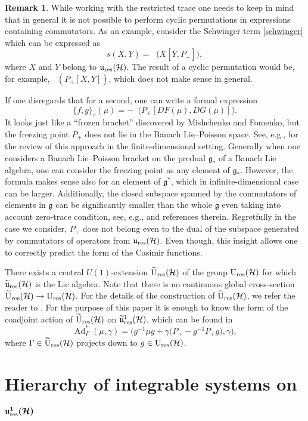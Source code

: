 \documentclass[10pt,a4paper]{amsart}
\theoremstyle{definition}
\newtheorem{rem}[thm]{Remark}
\numberwithin{equation}{section}
\renewcommand{\H}{\mathcal{H}}
\newcommand{\g}{\mathfrak{g}}
\newcommand{\Ur}{\mathrm{U}_{\textnormal{res}}(\H)}
\newcommand{\Urt}{\widetilde{\mathrm{U}}_{\textnormal{res}}(\H)}
\newcommand{\ur}{\mathfrak u_{\textnormal{res}}(\H)}
\newcommand{\urp}{\mathfrak u_{\textnormal{res}}^1(\H)}
\newcommand{\urt}{\widetilde{\mathfrak u}_{\textnormal{res}}(\H)}
\newcommand{\urtp}{\widetilde{\mathfrak u}_{\textnormal{res}}^1(\H)}
\DeclareMathOperator{\Trr}{Tr_{res}}
\DeclareMathOperator{\Ad}{Ad}
\renewcommand{\to}{\rightarrow}
\newcommand{\be}{\begin{equation}}
\newcommand{\ee}{\end{equation}}
\begin{document}
\begin{rem}\label{frozen}
While working with the restricted trace one needs to keep in mind that in general it is not possible to perform cyclic permutations in expressions containing commutators. As an example, consider the Schwinger term \eqref{schwinger} which can be expressed as
\begin{equation}\label{schwinger_expression}
s(X, Y) = \Trr\bigl(X[Y,P_+]\bigr),
\end{equation}
where $X$ and $Y$ belong to $\ur$. The result of a cyclic permutation would be, for example, $\Trr(P_+[X, Y])$, which does not make sense in general.

If one disregards that for a second, one can write a formal expression
\[ \{f,g\}_s(\mu)=-\Trr\bigl( P_+ [DF(\mu),DG(\mu)]\bigr). \]
It looks just like a ``frozen bracket'' discovered by Mishchenko and Fomenko, but the freezing point $P_+$ does not lie in the Banach Lie--Poisson space. See, e.g., \cite{bols-bor,fomenko-trofimov} for the review of this approach in the finite-dimensional setting. Generally when one considers a Banach Lie--Poisson bracket on the predual $\g_*$ of a Banach Lie algebra, one can consider the freezing point as any element of $\g_*$. However, the formula makes sense also for an element of $\g^*$, which in infinite-dimensional case can be larger. Additionally, the closed subspace spanned by the commutators of elements in $\g$ can be significantly smaller than the whole $\g$ even taking into account zero-trace condition, see, e.g., \cite{kalton89} and references therein. Regretfully in the case we consider, $P_+$ does not belong even to the dual of the subspace generated by commutators of operators from $\ur$. Even though, this insight allows one to correctly predict the form of the Casimir functions.
\end{rem}


There exists a central $U(1)$-extension $\Urt$ of the group $\Ur$ for which $\urt$ is the Lie algebra. Note that there is no continuous global cross-section $\Urt\to\Ur$. For the details of the construction of $\Urt$, we refer the reader to \cite{mickelsson,segal,wurzbacher}. For the purpose of this paper it is enough to know the form of the coadjoint action of $\Urt$ on $\urtp$, which can be found in \cite{Ratiu-grass,T-siegel,GO-grass}
\be\label{coad-ext}
\Ad^*_{\Gamma}(\mu,\gamma) = \bigl(g^{-1}\mu g + \gamma \bigl(P_+ - g^{-1}P_+ g\bigr), \gamma\bigr),
\ee where $\Gamma\in\Urt$ projects down to $g \in \Ur$.

\section[Hierarchy of integrable systems on u\*1\_res(H)]{Hierarchy of integrable systems on $\boldsymbol{\urp}$}\label{sec:int}
\end{document}
